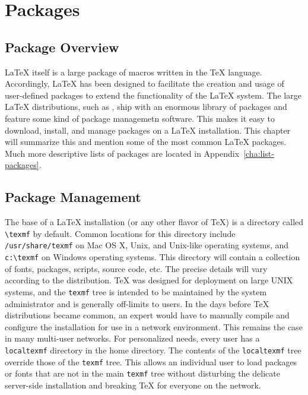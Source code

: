 \chapter{Packages}
\label{cha:packages}

\section{Package Overview}
\label{sec:package-overview}

\LaTeX{} itself is a large package of macros written in the \TeX{}
language.  Accordingly, \LaTeX{} has been designed to facilitate the
creation and usage of user-defined packages to extend the
functionality of the \LaTeX{} system.  The large \LaTeX{}
distributions, such as \MiKTeX{}, ship with an enormous library of
packages and feature some kind of package managemetn software.  This
makes it easy to download, install, and manage packages on a \LaTeX{}
installation.  This chapter will summarize this and mention some of
the most common \LaTeX{} packages.  Much more descriptive lists of
packages are located in Appendix~\ref{cha:list-packages}.

\section{Package Management}
\label{sec:package-management}

The base of a \LaTeX{} installation (or any other flavor of \TeX{}) is
a directory called \verb|\texmf| by default.  Common locations for
this directory include \verb|/usr/share/texmf| on Mac OS X, Unix, and
Unix-like operating systems, and \verb|c:\texmf| on Windows operating
systems.  This directory will contain a collection of fonts, packages,
scripts, source code, etc.  The precise details will vary according to
the distribution.  \TeX{} was designed for deployment on large UNIX
systems, and the \texttt{texmf} tree is intended to be maintained by
the system administrator and is generally off-limits to users.  In the
days before \TeX{} distributions became common, an expert would have
to manually compile and configure the installation for use in a
network environment.  This remains the case in many multi-user
networks.  For personalized needs, every user has a
\texttt{localtexmf} directory in the home directory.  The contents of
the \texttt{localtexmf} tree override those of the \texttt{texmf}
tree.  This allows an individual user to load packages or fonts that
are not in the main \texttt{texmf} tree without disturbing the
delicate server-side installation and breaking \TeX{} for everyone on
the network.


